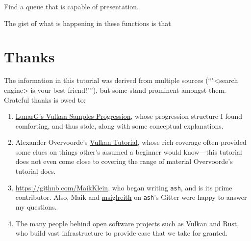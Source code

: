\documentclass[12pt,letterpaper]{article}
\newcommand{\inquotes}[1]{``#1''}	%
\newcommand{\ash}{\texttt{ash}}
\begin{document}
        Find a queue that is capable of presentation.
        
        
    
    The gist of what is happening in these functions is that 
        
\section{Thanks}
	The information in this tutorial was derived from multiple sources (\inquotes{"<search engine> is your best friend!"}), but some stand prominent amongst them. Grateful thanks is owed to:
		\begin{enumerate}
			\item \href{https://vulkan.lunarg.com/doc/sdk/1.0.65.1/windows/tutorial/html/index.html}{LunarG's Vulkan Samples Progression}, whose progression structure I found comforting, and thus stole, along with some conceptual explanations. 
			
			\item Alexander Overvoorde's \href{https://vulkan-tutorial.com/}{Vulkan Tutorial}, whose rich coverage often provided some clues on things other's assumed a beginner would know---this tutorial does not even come close to covering the range of material Overvoorde's tutorial does.
			
			\item \href{Maik Klein}{https://github.com/MaikKlein}, who began writing \ash, and is its prime contributor. Also, Maik and \href{https://github.com/msiglreith}{msiglreith} on \ash's Gitter were happy to answer my questions.
			
			\item The many people behind open software projects such as Vulkan and Rust, who build vast infrastructure to provide ease that we take for granted. 
		\end{enumerate}
\printbibliography
\end{document}

